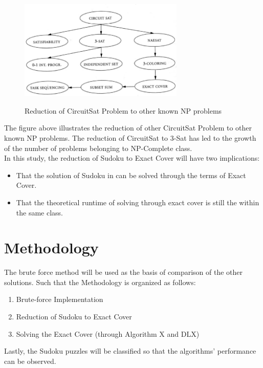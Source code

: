 \documentclass[a4paper,oneside,11pt]{report}
\newcounter{row}
\begin{document}
\begin{figure}
  \centering
  {\includegraphics[width=0.7\textwidth]{circuitsat.jpg}}
  \caption{Reduction of CircuitSat Problem to other known NP problems}
\end{figure}
The figure above illustrates the reduction of other CircuitSat Problem to other known NP problems. The reduction of CircuitSat to 3-Sat has led to the growth of the number of problems belonging to NP-Complete class.\\

\noindent In this study, the reduction of Sudoku to Exact Cover will have two implications:
\begin{itemize}
\item That the solution of Sudoku in can be solved through the terms of Exact Cover.
\item That the theoretical runtime of solving through exact cover is still the within the same class.
\end{itemize}

\chapter{Methodology}
The brute force method will be used as the basis of comparison of the other solutions. Such that the Methodology is organized as follows:
\begin{enumerate}
\item Brute-force Implementation
\vspace{-0.5cm}
\item Reduction of Sudoku to Exact Cover
\vspace{-0.5cm}
\item Solving the Exact Cover (through Algorithm X and DLX)
\end{enumerate}
Lastly, the Sudoku puzzles will be classified so that the algorithms’ performance can be observed.\\
\end{document}
